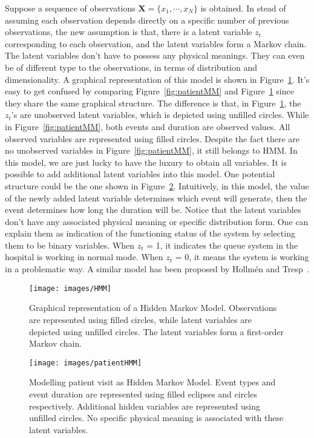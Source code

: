 Suppose a sequence of observations \(\mathbf{X} = \{x_1, \cdots, x_N\}\) is obtained. In stead of assuming each observation depends directly on a specific number of previous observations, the new assumption is that, there is a latent variable \(z_t\) corresponding to each observation, and the latent variables form a Markov chain. The latent variables don't have to possess any physical meanings. They can even be of different type to the observations, in terms of distribution and dimensionality. A graphical representation of this model is shown in Figure~\ref{fig:HMM}. It's easy to get confused by comparing Figure~\ref{fig:patientMM} and Figure~\ref{fig:HMM} since they share the same graphical structure. The difference is that, in Figure~\ref{fig:HMM}, the \(z_t\)'s are unobserved latent variables, which is depicted using unfilled circles. While in Figure~\ref{fig:patientMM}, both events and duration are observed values. All observed variables are represented using filled circles. Despite the fact there are no unobserved variables in Figure~\ref{fig:patientMM}, it still belongs to HMM. In this model, we are just lucky to have the luxury to obtain all variables. It is possible to add additional latent variables into this model. One potential structure could be the one shown in Figure~\ref{fig:patientHMM}. Intuitively, in this model, the value of the newly added latent variable determines which event will generate, then the event determines how long the duration will be. Notice that the latent variables don't have any associated physical meaning or specific distribution form. One can explain them as indication of the functioning status of the system by selecting them to be binary variables. When \(z_t\) = 1, it indicates the queue system in the hospital is working in normal mode. When \(z_t\) = 0, it means the system is working in a problematic way. A similar model has been proposed by Hollm\'en and Tresp~\cite{hollmen2000hidden}.

\begin{figure}[!ht]
	\begin{center}
		\texttt{[image: images/HMM]}
		\caption{Graphical representation of a Hidden Markov Model. Observations are represented using filled circles, while latent variables are depicted using unfilled circles. The latent variables form a first-order Markov chain.}
		\label{fig:HMM}
	\end{center}
\end{figure}

\begin{figure}[!ht]
	\begin{center}
		\texttt{[image: images/patientHMM]}
		\caption{Modelling patient visit as Hidden Markov Model. Event types and event duration are represented using filled eclipses and circles respectively. Additional hidden variables are represented using unfilled circles. No specific physical meaning is associated with these latent variables.}
		\label{fig:patientHMM}
	\end{center}
\end{figure}

